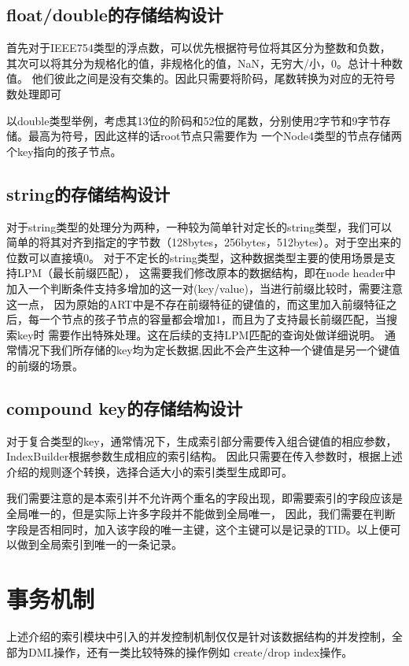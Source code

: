 \subsection{float/double的存储结构设计}
首先对于IEEE754类型的浮点数，可以优先根据符号位将其区分为整数和负数，
其次可以将其分为规格化的值，非规格化的值，NaN，无穷大/小，0。总计十种数值。
他们彼此之间是没有交集的。因此只需要将阶码，尾数转换为对应的无符号数处理即可

以double类型举例，考虑其13位的阶码和52位的尾数，分别使用2字节和9字节存储。最高为符号，因此这样的话root节点只需要作为
一个Node4类型的节点存储两个key指向的孩子节点。

\subsection{string的存储结构设计}
对于string类型的处理分为两种，一种较为简单针对定长的string类型，我们可以简单的将其对齐到指定的字节数（128bytes，256bytes，512bytes）。对于空出来的位数可以直接填0。
对于不定长的string类型，这种数据类型主要的使用场景是支持LPM（最长前缀匹配），
这需要我们修改原本的数据结构，即在node header中加入一个判断条件支持多增加的这一对(key/value)，当进行前缀比较时，需要注意这一点，
因为原始的ART中是不存在前缀特征的键值的，而这里加入前缀特征之后，每一个节点的孩子节点的容量都会增加1，而且为了支持最长前缀匹配，当搜索key时
需要作出特殊处理。这在后续的支持LPM匹配的查询处做详细说明。
通常情况下我们所存储的key均为定长数据,因此不会产生这种一个键值是另一个键值的前缀的场景。

\subsection{compound key的存储结构设计}
对于复合类型的key，通常情况下，生成索引部分需要传入组合键值的相应参数，IndexBuilder根据参数生成相应的索引结构。
因此只需要在传入参数时，根据上述介绍的规则逐个转换，选择合适大小的索引类型生成即可。

我们需要注意的是本索引并不允许两个重名的字段出现，即需要索引的字段应该是全局唯一的，但是实际上许多字段并不能做到全局唯一，
因此，我们需要在判断字段是否相同时，加入该字段的唯一主键，这个主键可以是记录的TID。以上便可以做到全局索引到唯一的一条记录。

\section{事务机制}
上述介绍的索引模块中引入的并发控制机制仅仅是针对该数据结构的并发控制，全部为DML操作，还有一类比较特殊的操作例如
create/drop index操作。

